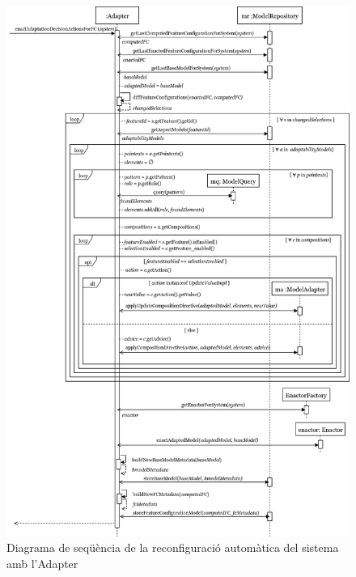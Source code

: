 \begin{figure}[!h]
\centering
\includegraphics[width=13cm]{Figures/Figure22}
\decoRule
\caption{Diagrama de seqüència de la reconfiguració automàtica del sistema amb l'Adapter}
\label{fig:Figura22}
\end{figure}
